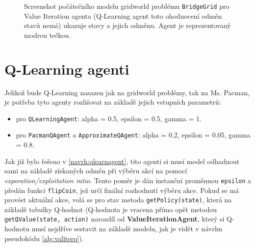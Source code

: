 \begin{figure}[!htbp]
\begin{center}
  \caption{Screenshot počátečního modelu gridworld problému \texttt{BridgeGrid} pro Value Iteration agenta (Q-Learning agent toto ohodnocení odměn stavů nemá) ukazuje stavy a jejich odměnu. Agent je reprezentovaný modrou tečkou.}
  \label{img:bridgeGridDefault}
\end{center}
\end{figure}

\section{Q-Learning agenti}
Jelikož bude Q-Learning nasazen jak na gridworld problémy, tak na Ms. Pacman, je potřeba tyto agenty rozlišovat na základě jejich vstupních parametrů:
\begin{itemize}
\item pro \texttt{QLearningAgent}: alpha = 0.5, epsilon = 0.5, gamma = 1.
\item pro \texttt{PacmanQAgent} a \texttt{ApproximateQAgent}: alpha = 0.2, epsilon = 0.05, gamma = 0.8.
\end{itemize}

Jak již bylo řešeno v \ref{navrh:qlearnagent}, tito agenti si musí model odhadnout sami na základě získaných odměn při výběru akcí na pomocí \textit{exporation/exploitation ratio}. Tento poměr je dán instanční proměnnou \texttt{epsilon} a předán funkci \texttt{flipCoin}, jež určí finální rozhodnutí výběru akce. Pokud se má provést aktuální akce, volá se pro stav metoda \texttt{getPolicy(state)}, která na základě tabulky Q-hodnot (Q-hodnota je vracena přímo opět metodou \texttt{getQValue(state, action)} narozdíl od \textbf{ValueIterationAgent}, který si Q-hodnotu musí nejdříve sestavit na základě modelu, jak je vidět v návrhu pseudokódu \ref{alg:valiterq}).

